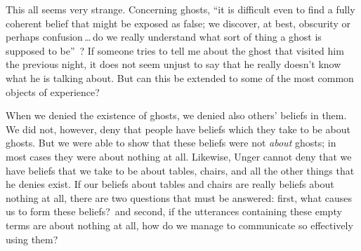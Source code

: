 \documentclass[11pt]{article}
\begin{document}
\begin{spacing}{1.5}
This all seems very strange. Concerning ghosts, ``it is difficult even to find a fully coherent belief that might be exposed as false; we discover, at best, obscurity or perhaps confusion\,\ldots\,do we really understand what sort of thing a ghost is supposed to be''~\citep[76]{stroud2000a}? If someone tries to tell me about the ghost that visited him the previous night, it does not seem unjust to say that he really doesn't know what he is talking about. But can this be extended to some of the most common objects of experience?

When we denied the existence of ghosts, we denied also others' beliefs in them. We did not, however, deny that people have beliefs which they take to be about ghosts. But we were able to show that these beliefs were not {\em about} ghosts; in most cases they were about nothing at all. Likewise, Unger cannot deny that we have beliefs that we take to be about tables, chairs, and all the other things that he denies exist. If our beliefs about tables and chairs are really beliefs about nothing at all, there are two questions that must be answered: first, what causes us to form these beliefs?\ and second, if the utterances containing these empty terms are about nothing at all, how do we manage to communicate so effectively using them?


\end{spacing}
\end{document}
